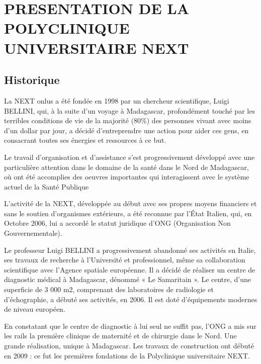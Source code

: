 \chapter{PRESENTATION DE LA POLYCLINIQUE
  UNIVERSITAIRE NEXT}
\minitoc
\newpage
	\section{Historique}
  	
  	La NEXT onlus a été fondée en 1998 par un chercheur scientifique, Luigi BELLINI, qui, à la
  	suite d'un voyage à Madagascar, profondément touché par les terribles conditions de vie de
  	la majorité (80\%) des personnes vivant avec moins d'un dollar par jour, a décidé
  	d'entreprendre une action pour aider ces gens, en consacrant toutes ses énergies et
  	ressources à ce but.
  	\medskip
  	
  	Le travail d'organisation et d'assistance s'est progressivement développé avec une
  	particulière attention dans le domaine de la santé dans le Nord de Madagascar, où ont été
  	accomplies des oeuvres importantes qui interagissent avec le système actuel de la Santé
  	Publique
  	\medskip
  	
  	L'activité de la NEXT, développée au début avec ses propres moyens financiers et sans le
  	soutien d'organismes extérieurs, a été reconnue par l'État Italien, qui, en Octobre 2006, lui a
  	accordé le statut juridique d'ONG (Organisation Non Gouvernementale).
  	\medskip
  	
  	Le professeur Luigi BELLINI a progressivement abandonné ses activités en Italie, ses
  	travaux de recherche à l'Université et professionnel, même sa collaboration scientifique avec
  	l'Agence spatiale européenne. Il a décidé de réaliser un centre de diagnostic médical à
  	Madagascar, dénommé « Le Samaritain ». Le centre, d'une superficie de 3 000 m2,
  	comprenant des laboratoires de radiologie et d'échographie, a débuté ses activités, en 2006.
  	Il est doté d'équipements modernes de niveau européen.
  	\medskip
  	
  	En constatant que le centre de diagnostic à lui seul ne suffit pas, l'ONG a mis sur les rails la
  	première clinique de maternité et de chirurgie dans le Nord. Une grande réalisation, unique à
  	Madagascar. Les travaux de construction ont débuté en 2009 : ce fut les premières
  	fondations de la Polyclinique universitaire NEXT.
  	
